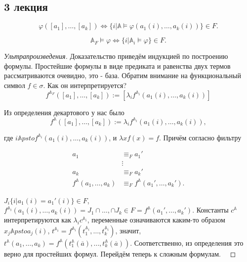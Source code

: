 \subsection{3 лекция}

\begin{stat}
    $$\varphi([a_1], \ldots, [a_k]) \Longleftrightarrow \{i| \mathbb{A} \models \varphi(a_1(i), \ldots, a_k(i))\} \in F.$$ 
\end{stat} 

\begin{stat}[Следствие]
    $$\mathbb{A}_F \models \varphi \Longleftrightarrow \{i | \mathbb{A}_i \models \varphi\} \in F.$$
\end{stat} 

\begin{proof}[Ультрапроизведения]
    Доказательство приведём индукцией по построению формулы. Простейшие формулы в виде предиката и равенства двух термов рассматриваются очевидно, это - база. Обратим внимание на функциональный символ $f \in \sigma$. Как он интерпретируется? $$f^{\mathbb{A}_F}([a_1], \ldots, [a_k]):= [\lambda_i f^{\mathbb{A}_i}(a_1(i), \ldots, a_k(i))]$$ 

    Из определения декартового у нас было $$f^{\mathbb{A}}([a_1], \ldots, [a_k]):= \lambda_i f^{\mathbb{A}_i}(a_1(i), \ldots, a_k(i)),$$ 

    где $i \mathbb{A}psto f^{\mathbb{A}_i}(a_1(i), \ldots, a_k(i))$, и $\lambda x f(x) = f$. Причём согласно фильтру 

    \begin{equation*}
        \begin{aligned}
            a_1 &\equiv_F a_1' \\ 
            &\vdots \\ 
            a_k &\equiv_F a_k' \\ 
            f^{\mathbb{A}}(a_1, \ldots, a_k) &\equiv_F f^{\mathbb{A}}(a_1', \ldots, a_k').
        \end{aligned}
    \end{equation*} 

    $J_i \{i| a_1(i) = a_1'(i)\} \in F$, $f^{\mathbb{A}_i}(a_1(i), \ldots, a_k(i)) = J_1 \cap \ldots, \cap J_k \in F = f^{\mathbb{A}}(a_1', \ldots, a_k')$. Константы $c^{\mathbb{A}}$ интерпретируются как $\lambda_i c^{\mathbb{A}_i}$, переменные означиваются каким-то образом $x_j \mathbb{A}psto a_j(i)$, $t^{\mathbb{A}_i} = f^{\mathbb{A}_i}(t_1^{\mathbb{A}_i}, \ldots, t_k^{\mathbb{A}_i})$, значит, $t^{\mathbb{A}}(a_1, \ldots, a_k) = f^{\mathbb{A}}(t_1^{\mathbb{A}}(\overline{a}), \ldots, t_k^{\mathbb{A}}(\overline{a}))$. Соответственно, из определения это верно для простейших формул. Перейдём теперь к сложным формулам. \ 
    

\end{proof}
